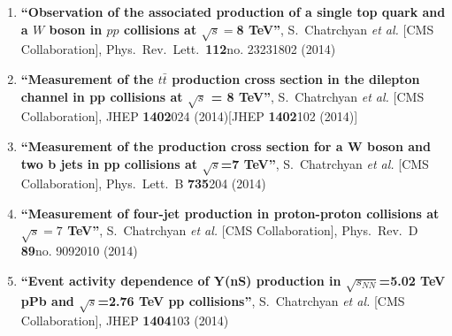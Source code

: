 \begin{enumerate}
\item%
{\bf ``Observation of the associated production of a single top quark and a $W$ boson in $pp$ collisions at $\sqrt s = $8 TeV''}, 
  S.~Chatrchyan {\it et al.}  [CMS Collaboration], 
Phys.\ Rev.\ Lett.\  {\bf 112}no. 23231802 (2014) %


\item%
{\bf ``Measurement of the $t \bar{t}$ production cross section in the dilepton channel in pp collisions at $\sqrt{s}$ = 8 TeV''}, 
  S.~Chatrchyan {\it et al.}  [CMS Collaboration], 
JHEP {\bf 1402}024 (2014)[JHEP {\bf 1402}102 (2014)] %


\item%
{\bf ``Measurement of the production cross section for a W boson and two b jets in pp collisions at $\sqrt{s}$=7 TeV''}, 
  S.~Chatrchyan {\it et al.}  [CMS Collaboration], 
Phys.\ Lett.\ B {\bf 735}204 (2014) %


\item%
{\bf ``Measurement of four-jet production in proton-proton collisions at $\sqrt{s}=7$ TeV''}, 
  S.~Chatrchyan {\it et al.}  [CMS Collaboration], 
Phys.\ Rev.\ D {\bf 89}no. 9092010 (2014) %


\item%
{\bf ``Event activity dependence of Y(nS) production in $\sqrt{s_{NN}}$=5.02 TeV pPb and $\sqrt{s}$=2.76 TeV pp collisions''}, 
  S.~Chatrchyan {\it et al.}  [CMS Collaboration], 
JHEP {\bf 1404}103 (2014) %



\end{enumerate}
